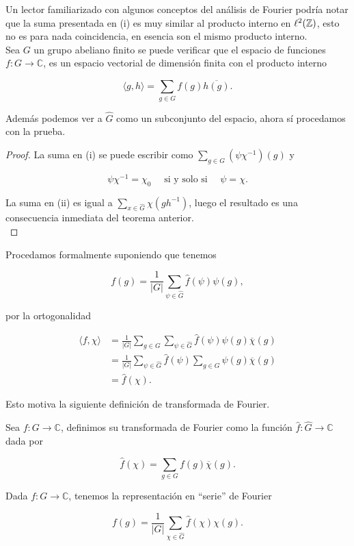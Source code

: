 \begin{note}
Un lector familiarizado con algunos conceptos del análisis de Fourier podría notar que la suma presentada en (i) es muy similar al producto interno en $\ell^2(\mathbb{Z})$, esto no es para nada coincidencia, en esencia son el mismo producto interno.\\

Sea $G$ un grupo abeliano finito se puede verificar que el espacio de funciones $ f:G \to \mathbb{C}$, es un espacio vectorial de dimensión finita con el producto interno

$$
\langle g, h \rangle = \sum_{g \in G} f(g) \overline{h(g)}.
$$

Además podemos ver a  $\widehat{G}$ como un subconjunto del espacio, ahora sí procedamos con la prueba.\\
\end{note}

\begin{proof}
La suma en (i) se puede escribir como $\displaystyle\sum_{g \in G}\left(\psi \chi^{-1}\right)(g)$ y

$$
\psi \chi^{-1}=\chi_0 \quad \text { si y solo si } \quad \psi=\chi.
$$


La suma en (ii) es igual a $\displaystyle\sum_{x \in \widehat{G}} \chi\left(g h^{-1}\right)$, luego el resultado es una consecuencia inmediata del teorema anterior.\\
\end{proof}

Procedamos formalmente suponiendo que tenemos 

$$
f(g)=\frac{1}{|G|}\sum_{\psi \in \widehat{G}}\widehat{f}(\psi) \psi(g),
$$

por la ortogonalidad

\begin{align*}
    \langle f, \chi\rangle&=\frac{1}{|G|}\sum_{g\in G}\sum_{\psi \in \widehat{G}}\widehat{f}(\psi) \psi(g)\overline{\chi}(g)\\
    &=\frac{1}{|G|}\sum_{\psi \in \widehat{G}}\widehat{f}(\psi)\sum_{g\in G}\psi(g)\overline{\chi}(g)\\
    &=\widehat{f}(\chi)
.\end{align*}

Esto motiva la siguiente definición de transformada de Fourier.

\begin{definition}
Sea $f: G \rightarrow \mathbb{C}$, definimos su transformada de Fourier como la función $\widehat{f}: \widehat{G} \rightarrow \mathbb{C}$ dada por

$$
\widehat{f}(\chi)=\sum_{g\in G} f(g) \overline{\chi}(g).
$$

\end{definition}
\begin{theorem}
Dada $f: G \rightarrow \mathbb{C}$, tenemos la representación en ``serie'' de Fourier

$$
f(g)=\frac{1}{|G|}\sum_{\chi \in \widehat{G}}\widehat{f}(\chi) \chi(g).
$$

\end{theorem}

